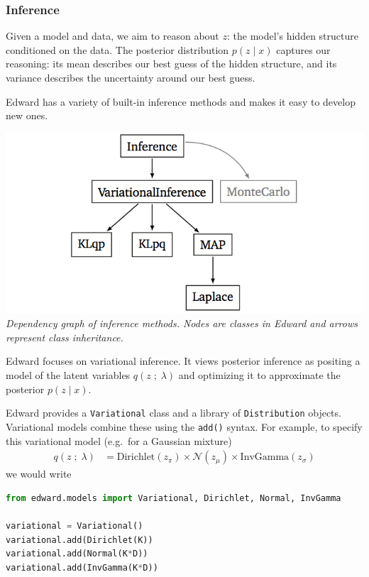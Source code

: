 \subsubsection{Inference}\label{inference}

Given a model and data, we aim to
reason about $z$: the model's hidden structure conditioned on the data. The
posterior distribution $p(z \mid x)$ captures our reasoning: its mean
describes our best guess of the hidden structure, and its variance
describes the uncertainty around our best guess.

Edward has a variety of built-in inference methods and makes it easy
to develop new ones.

\includegraphics{images/inference_structure.png}
{\small\textit{Dependency graph of inference methods.
Nodes are classes in Edward and arrows represent class inheritance.}}

Edward focuses on variational inference. It views posterior inference
as positing a model of the latent variables $q(z \;;\; \lambda)$ and optimizing it to
approximate the posterior $p(z \mid x)$.


Edward provides a \texttt{Variational} class and a library of
\texttt{Distribution} objects. Variational models combine these using
the \texttt{add()} syntax.
For example, to specify this variational model (e.g.~for a Gaussian mixture)
\begin{align*}
  q(z \;;\; \lambda)
  &=
  \text{Dirichlet}(z_\pi)
  \times
  \mathcal{N}(z_\mu)
  \times
  \text{InvGamma}(z_\sigma)
\end{align*}
we would write
\begin{lstlisting}[language=Python]
from edward.models import Variational, Dirichlet, Normal, InvGamma

variational = Variational()
variational.add(Dirichlet(K))
variational.add(Normal(K*D))
variational.add(InvGamma(K*D))
\end{lstlisting}

